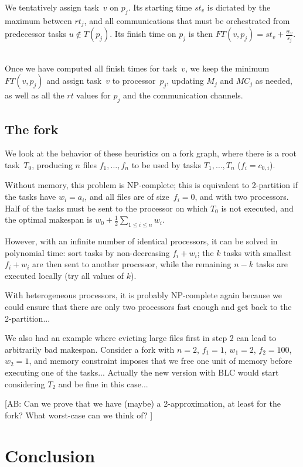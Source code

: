 \documentclass[sigconf,review,anonymous]{acmart}
\newcommand{\MM}{M}
\newcommand{\MC}{MC}
\newcommand{\AB}[1]{{\color{purple}[AB: #1]}}
\begin{document}
\smallskip
{} We tentatively assign task~$v$ on $p_j$. Its starting time $st_v$
is dictated by the maximum between $rt_j$, and all communications that
must be orchestrated from predecessor tasks $u\notin T(p_j)$. Its
finish time on $p_j$ is then 
$FT(v,p_j) = st_v + \frac{w_v}{s_j}$. 


\medskip
{}\\
Once we have computed all finish times for task~$v$, 
we keep the minimum $FT(v,p_j)$ and assign task~$v$
to processor~$p_j$, updating $\MM_j$ and $\MC_j$ as needed,
as well as all the $rt$ values for $p_j$ and the communication channels.


\subsection{The fork}
We look at the behavior of these heuristics on a fork graph,
where there is a root task~$T_0$, producing $n$ files $f_1, \ldots, f_n$
to be used by tasks $T_1, \ldots, T_n$ ($f_i = c_{0,i}$).

Without memory, this problem is NP-complete; this is equivalent
to 2-partition if the tasks have $w_i=a_i$, and all files are of size~$f_i=0$,
and with two processors. Half of the tasks must be sent to the processor
on which $T_0$ is not executed, and the optimal makespan is 
$w_0+\frac{1}{2}\sum_{1\leq i \leq n} w_i$.

However, with an infinite number of identical processors, it can be
solved in polynomial time: sort tasks by non-decreasing $f_i+w_i$; 
the $k$ tasks with smallest $f_i+w_i$ are then sent to another processor,
while the remaining $n-k$ tasks are executed locally (try all values of $k$).

With heterogeneous processors, it is probably NP-complete again
because we could ensure that there are only two processors fast enough
and get back to the 2-partition...

We also had an example where evicting large files first in step 2
can lead to arbitrarily bad makespan. Consider a fork with $n=2$,
$f_1=1$, $w_1=2$, $f_2=100$, $w_2=1$, and memory constraint
imposes that we free one unit of memory before executing one
of the tasks... Actually the new version with BLC would start 
considering $T_2$ and be fine in this case...


\AB{Can we prove that we have (maybe) a 2-approximation, 
at least for the fork? What worst-case can we think of? }




\section{Conclusion}






    
    
\end{document}
